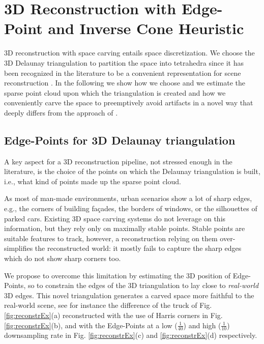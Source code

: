 \section{3D Reconstruction with Edge-Point and Inverse Cone Heuristic}
\label{sec:3D-Reconstruction}
3D reconstruction with space carving entails space discretization.
We choose the 3D Delaunay triangulation to partition the space into tetrahedra since it has been recognized in the literature to be a convenient representation for scene reconstruction \cite{litvinov_lhuillier_13, Pan_et_al09, labatut2007efficient, Lovi_et_al_11}.
In the following we show how we choose and we estimate the sparse point cloud upon which the triangulation is created and how we conveniently carve the space to preemptively avoid artifacts in a novel way that deeply differs from the approach of \cite{litvinov_Lhiuller14}.

\subsection{Edge-Points for 3D Delaunay triangulation}
\label{subsec:pcl_estimation}
A key aspect for a 3D reconstruction pipeline, not stressed enough in the literature, is the choice of the points on which the Delaunay triangulation is built, i.e., what kind of points made up the sparse point cloud.

As most of man-made environments, urban scenarios show a lot of sharp edges, e.g., the corners of building fa\c{c}ades, the borders of windows, or the silhouettes of parked cars. Existing 3D space carving systems do not leverage on this information, but they rely only on maximally stable points.
Stable points are suitable features to track, however, a reconstruction relying on them over-simplifies the reconstructed world: it mostly fails to capture the sharp edges which do not show sharp corners too.

We propose to overcome this limitation by estimating the 3D position of Edge-Points, so to constrain the edges of the 3D triangulation to lay close to \emph{real-world} 3D edges. 
This novel triangulation generates a carved space more faithful to the real-world scene, see for instance the difference of the truck of Fig. \ref{fig:reconstrEx}(a) reconstructed with the use of Harris corners in Fig. \ref{fig:reconstrEx}(b), and with the Edge-Points at a low ($\frac{1}{40}$) and high ($\frac{1}{10}$) downsampling rate  in Fig. \ref{fig:reconstrEx}(c) and \ref{fig:reconstrEx}(d) respectively. 

